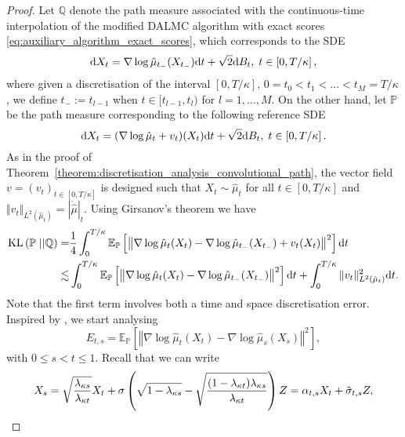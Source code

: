 \begin{proof}
    Let $\mathbb{Q}$ denote the path measure associated with the continuous-time interpolation of the modified \gls*{DALMC} algorithm  with exact scores \eqref{eq:auxiliary_algorithm_exact_scores}, which corresponds to the SDE 
\begin{equation*}
    \mathrm{d} X_t = \nabla\log \hat{\mu}_{t_-}(X_{t_-})\mathrm{d} t + \sqrt{2}\mathrm{d} B_t,\; t\in\left[0,T/\kappa\right],
\end{equation*}
where given a discretisation of the interval $\left[0,T/\kappa\right]$, $0=t_0<t_1<\dots<t_M=T/\kappa$, we define $t_-:=t_{l-1}$ when $t\in [t_{l-1}, t_l)$ for $l=1,\dots, M$. On the other hand, let $\mathbb{P}$ be the path measure corresponding to the following reference SDE
\begin{equation*}
    \mathrm{d} X_t = (\nabla\log \hat{\mu}_t + v_t)(X_t)\mathrm{d} t + \sqrt{2}\mathrm{d} B_t,\; t\in\left[0,T/\kappa\right].
\end{equation*}
As in the proof of Theorem~\ref{theorem:discretisation_analysis_convolutional_path}, the vector field $v = (v_t)_{t\in\left[0,T/\kappa\right]}$ is designed such that $X_t\sim\hat{\mu}_t$ for all $t\in\left[0, T/\kappa\right]$ and $\Vert v_t\Vert_{L^2(\hat{\mu}_t)} = \left\vert\Dot{\hat{\mu}}\right\vert_t$.
Using Girsanov's theorem we have
\begin{align}
    \operatorname*{KL}\left(\mathbb{P}\;||\mathbb{Q}\right)=& \frac{1}{4}\int_0^{T/\kappa}\mathbb{E}_{\mathbb{P}}\left[\left\Vert \nabla\log \hat{\mu}_t(X_t)-\nabla \log \hat{\mu}_{t_-}(X_{t_-}) + v_t(X_t)\right\Vert^2\right]\mathrm{d} t\nonumber\\
    \lesssim& \int_0^{T/\kappa}\mathbb{E}_{\mathbb{P}} \left[\left\Vert \nabla\log \hat{\mu}_t(X_t)-\nabla \log \hat{\mu}_{t_-}(X_{t_-})\right\Vert^2\right]\mathrm{d} t + \int_0^{T/\kappa} \Vert v_t\Vert^2_{L^2({\hat{\mu}}_t)} \mathrm{d} t. \nonumber
\end{align}
Note that the first term involves both a time and space discretisation error. 
Inspired by \citet{Chen2022ImprovedAO}, we start analysing
\begin{equation*}
    E_{t, s} = \mathbb{E}_{\mathbb{P}}\left[\left\Vert \nabla\log \hat{\mu}_t(X_t) - \nabla\log \hat{\mu}_s(X_s)\right\Vert^2\right],
\end{equation*}
with $0\leq s< t\leq 1$. Recall that we can write
\begin{equation*}
    X_s = \sqrt{\frac{\lambda_{\kappa s}}{\lambda_{\kappa t}}} X_t + \sigma \left(\sqrt{1-\lambda_{\kappa s}} - \sqrt{\frac{(1-\lambda_{\kappa t})\lambda_{\kappa s}}{\lambda_{\kappa t}}}\right) Z = \alpha_{t, s} X_t + \Tilde{\sigma}_{t,s} Z,

\end{equation*}
\end{proof}
